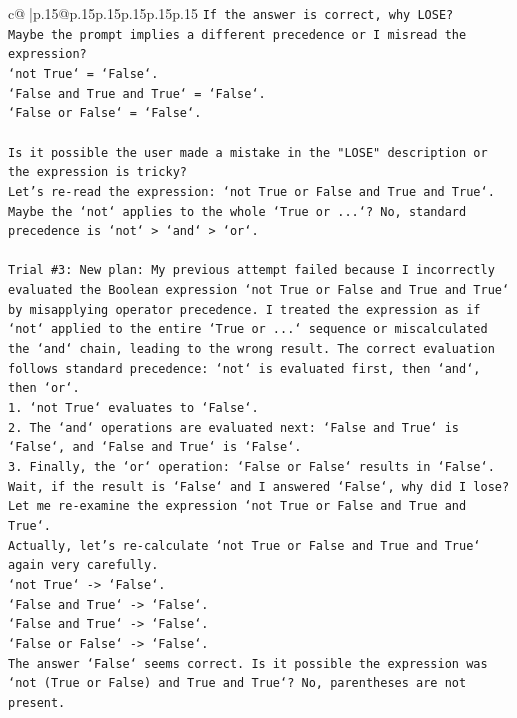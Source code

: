 \documentclass{article}
\begin{document}
{\begin{supertabular}{c@{$\;$}|p{.15\linewidth}@{}p{.15\linewidth}p{.15\linewidth}p{.15\linewidth}p{.15\linewidth}p{.15\linewidth}}
{{{\texttt{If the answer is correct, why LOSE?} \\
\texttt{Maybe the prompt implies a different precedence or I misread the expression?} \\
\texttt{`not True` = `False`.} \\
\texttt{`False and True and True` = `False`.} \\
\texttt{`False or False` = `False`.} \\
\\ 
\texttt{Is it possible the user made a mistake in the "LOSE" description or the expression is tricky?} \\
\texttt{Let's re{-}read the expression: `not True or False and True and True`.} \\
\texttt{Maybe the `not` applies to the whole `True or ...`? No, standard precedence is `not` > `and` > `or`.} \\
\\ 
\texttt{Trial \#3: New plan: My previous attempt failed because I incorrectly evaluated the Boolean expression `not True or False and True and True` by misapplying operator precedence. I treated the expression as if `not` applied to the entire `True or ...` sequence or miscalculated the `and` chain, leading to the wrong result. The correct evaluation follows standard precedence: `not` is evaluated first, then `and`, then `or`.} \\
\texttt{1. `not True` evaluates to `False`.} \\
\texttt{2. The `and` operations are evaluated next: `False and True` is `False`, and `False and True` is `False`.} \\
\texttt{3. Finally, the `or` operation: `False or False` results in `False`.} \\
\texttt{Wait, if the result is `False` and I answered `False`, why did I lose? Let me re{-}examine the expression `not True or False and True and True`.} \\
\texttt{Actually, let's re{-}calculate `not True or False and True and True` again very carefully.} \\
\texttt{`not True` {-}> `False`.} \\
\texttt{`False and True` {-}> `False`.} \\
\texttt{`False and True` {-}> `False`.} \\
\texttt{`False or False` {-}> `False`.} \\
\texttt{The answer `False` seems correct. Is it possible the expression was `not (True or False) and True and True`? No, parentheses are not present.} \\
}}}
\end{supertabular}}
\end{document}
